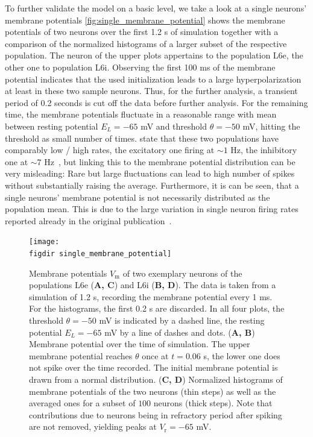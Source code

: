 To further validate the model on a basic level, we take a look at a single neurons' membrane potentials 
\autoref{fig:single_membrane_potential} shows the membrane 
potentials of two neurons over the first 1.2 s of simulation together with a comparison of
the normalized histograms of a larger subset of the 
respective population. The neuron of the upper plots appertains to the population
L6e, the other one to population L6i. 
Observing the first 100 ms of the membrane potential 
indicates that the used initialization leads to a large hyperpolarization at least in these two 
sample neurons. Thus, for the further analysis, a transient period of 0.2 seconds is cut off the
data before further analysis. For the remaining time, the membrane potentials fluctuate 
in a reasonable range with mean between resting potential $E_L = -65$ mV and threshold $\theta = -50$ mV, 
hitting the threshold as small number of times. 
 state that
these two populations have comparably low / high rates, the excitatory one firing at 
$\sim 1$ Hz, the inhibitory one at $\sim 7$ Hz~\cite{potjans2014}, 
but linking this to the membrane potential distribution can be very misleading:
Rare but large fluctuations can lead to high number of spikes without substantially 
raising the average. 
Furthermore, it is can be seen, that a single 
neurons' membrane potential is not necessarily distributed as the population mean. 
This is due to the large variation in single neuron firing rates reported already in the 
original publication~\cite{potjans2014}. 

\begin{figure}[tb]
    \centering
    \texttt{[image: \\figdir single\_membrane\_potential]}
    \caption[Exemplary membrane potentials]{
        Membrane potentials $V_\text{m}$ of two exemplary neurons of the populations 
        L6e (\textbf{A, C}) and L6i (\textbf{B, D}). The data is taken from 
        a simulation of 1.2 s, recording the membrane potential every 1 ms.
        For the histograms, the first 0.2 s are discarded. 
        In all four plots, the threshold $\theta = -50$ mV is indicated by a dashed line, 
        the resting potential $E_L = -65$ mV by a line of dashes and dots. 
        \quad (\textbf{A, B}) Membrane potential over the time of simulation. 
        The upper membrane potential reaches $\theta$ once at $t = 0.06$ s, 
        the lower one does not spike over the time recorded. 
        The initial membrane potential 
        is drawn from a normal distribution.
        \quad (\textbf{C, D}) Normalized histograms of membrane potentials of the
        two neurons (thin steps) as well as the averaged ones for a subset of $100$ 
        neurons (thick steps). 
        Note that contributions due to neurons being in refractory 
        period after spiking are not removed, yielding peaks at $V_\text{r} = -65$ mV. 
    }
    \label{fig:single_membrane_potential}
\end{figure}



